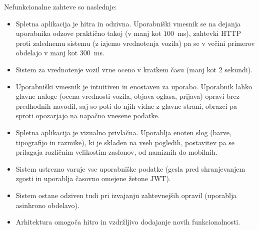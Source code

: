 \documentclass[a4paper,12pt,openright]{book}
\begin{document}
Nefunkcionalne zahteve so naslednje:
\begin{itemize}
    \item Spletna aplikacija je hitra in odzivna. Uporabniški vmesnik se na dejanja
    uporabnika odzove praktično takoj (v manj kot $100$~ms), zahtevki HTTP proti
    zalednemu sistemu (z izjemo vrednotenja vozila) pa se v večini primerov
    obdelajo v manj kot $300$~ms.
    \item Sistem za vrednotenje vozil vrne oceno v kratkem času (manj kot 2 sekundi).
    \item Uporabniški vmesnik je intuitiven in enostaven za uporabo. Uporabnik
    lahko glavne naloge (ocena vrednosti vozila, objava oglasa, prijava) opravi
    brez predhodnih navodil, saj so poti do njih vidne z glavne strani, obrazci
    pa sproti opozarjajo na napačno vnesene podatke.
    \item Spletna aplikacija je vizualno privlačna. Uporablja enoten slog
    (barve, tipografijo in razmike), ki je skladen na vseh pogledih, postavitev
    pa se prilagaja različnim velikostim zaslonov, od namiznih do mobilnih.
    \item Sistem ustrezno varuje vse uporabniške podatke (gesla pred shranjevanjem zgosti in uporablja časovno omejene žetone JWT).
    \item Sistem ostane odziven tudi pri izvajanju zahtevnejših opravil (uporablja asinhrono obdelavo).
    \item Arhitektura omogoča hitro in vzdržljivo dodajanje novih funkcionalnosti.
\end{itemize}
\end{document}
